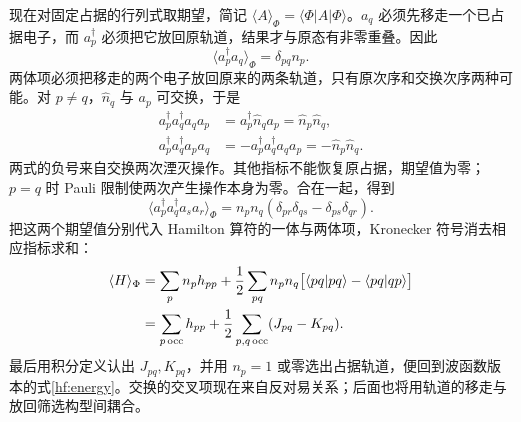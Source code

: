 现在对固定占据的行列式取期望，简记 $\langle A\rangle_\Phi=\langle\Phi|A|\Phi\rangle$。$a_q$ 必须先移走一个已占据电子，而 $a_p^\dagger$ 必须把它放回原轨道，结果才与原态有非零重叠。因此
\begin{equation}\label{hf:one-body-contraction}
\langle a_p^\dagger a_q\rangle_\Phi=\delta_{pq}n_p.
\end{equation}
两体项必须把移走的两个电子放回原来的两条轨道，只有原次序和交换次序两种可能。对 $p\ne q$，$\hat n_q$ 与 $a_p$ 可交换，于是
\begin{align}
a_p^\dagger a_q^\dagger a_q a_p&=a_p^\dagger\hat n_q a_p=\hat n_p\hat n_q,\\
a_p^\dagger a_q^\dagger a_p a_q&=-a_p^\dagger a_q^\dagger a_q a_p=-\hat n_p\hat n_q.
\end{align}
两式的负号来自交换两次湮灭操作。其他指标不能恢复原占据，期望值为零；$p=q$ 时 Pauli 限制使两次产生操作本身为零。合在一起，得到
\begin{equation}\label{hf:two-body-contraction}
\langle a_p^\dagger a_q^\dagger a_s a_r\rangle_\Phi
=n_pn_q(\delta_{pr}\delta_{qs}-\delta_{ps}\delta_{qr}).
\end{equation}
把这两个期望值分别代入 Hamilton 算符的一体与两体项，Kronecker 符号消去相应指标求和：
\begin{align}
\langle H\rangle_\Phi
&=\sum_p n_ph_{pp}+\frac12\sum_{pq}n_pn_q
\bigl[\langle pq|pq\rangle-\langle pq|qp\rangle\bigr]\notag\\
&=\sum_{p\,\mathrm{occ}}h_{pp}
+\frac12\sum_{p,q\,\mathrm{occ}}(J_{pq}-K_{pq}).
\end{align}
最后用积分定义认出 $J_{pq},K_{pq}$，并用 $n_p=1$ 或零选出占据轨道，便回到波函数版本的式\eqref{hf:energy}。交换的交叉项现在来自反对易关系；后面也将用轨道的移走与放回筛选构型间耦合。

